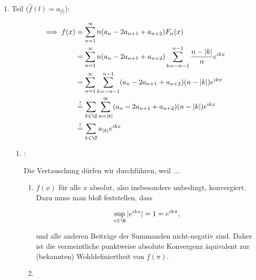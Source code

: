 \begin{solution}
\begin{enumerate}[label = \arabic*.]
    \item Teil ($\hat f(l) = a_{|l|}$):
    

    \begin{align*}
        \implies
        f(x)
        & =
        \sum_{n=1}^\infty
        n (a_n - 2 a_{n+1} + a_{n+2})
        F_n(x) \\
        & =
        \sum_{n=1}^\infty
        n (a_n - 2 a_{n+1} + a_{n+2})
        \sum_{k = -n-1}^{n-1}
        \frac{n - |k|}{n}
        e^{i k x} \\
        & =
        \sum_{n=1}^\infty
        \sum_{k = -n-1}^{n-1}
        (a_n - 2 a_{n+1} + a_{n+2})
        (n - |k|)
        e^{i k x} \\
        & \stackrel{!}{=}
        \sum_{k \in \Z}
        \sum_{n = |k|}^\infty
        (a_n - 2 a_{n+1} + a_{n+2})
        (n - |k|)
        e^{i k x} \\
        & \stackrel{!}{=}
        \sum_{k \in \Z}
        a_{|k|}
        e^{i k x}
    \end{align*}

    \begin{enumerate}[label = \arabic*.]

        \item \Quote{!}:

        Die Vertauschung dürfen wir durchführen, weil ...

        \begin{enumerate}[label = \arabic*.]
    
            \item $f(x)$ für alle $x$ absolut, also insbesondere unbedingt, konvergiert.
            Dazu muss man bloß feststellen, dass
    
            \begin{align*}
                \sup_{x \in \R} |e^{i k x}|
                =
                1
                =
                e^{i k \pi},
            \end{align*}
    
            und alle anderen Beiträge der Summanden nicht-negativ sind.
            Daher ist die vermeintliche punktweise absolute Konvergenz äquivalent zur (bekannten) Wohldefiniertheit von $f(\pi)$.
    
            \item \phantom{}
    

\end{enumerate}
\end{enumerate}
\end{enumerate}
\end{solution}
